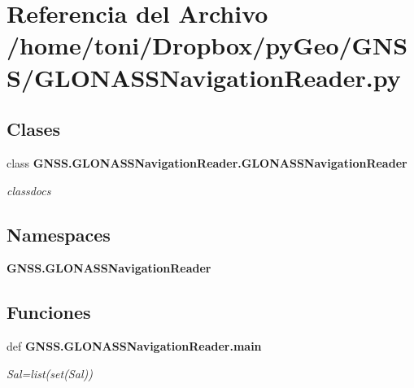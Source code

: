 \section{Referencia del Archivo /home/toni/\-Dropbox/py\-Geo/\-G\-N\-S\-S/\-G\-L\-O\-N\-A\-S\-S\-Navigation\-Reader.py}
\label{GLONASSNavigationReader_8py}
\subsection*{Clases}
\begin{DoxyCompactItemize}
\item 
class {\bf G\-N\-S\-S.\-G\-L\-O\-N\-A\-S\-S\-Navigation\-Reader.\-G\-L\-O\-N\-A\-S\-S\-Navigation\-Reader}
\begin{DoxyCompactList}\small\item\em classdocs \end{DoxyCompactList}\end{DoxyCompactItemize}
\subsection*{Namespaces}
\begin{DoxyCompactItemize}
\item 
{\bf G\-N\-S\-S.\-G\-L\-O\-N\-A\-S\-S\-Navigation\-Reader}
\end{DoxyCompactItemize}
\subsection*{Funciones}
\begin{DoxyCompactItemize}
\item 
def {\bf G\-N\-S\-S.\-G\-L\-O\-N\-A\-S\-S\-Navigation\-Reader.\-main}
\begin{DoxyCompactList}\small\item\em Sal=list(set(\-Sal)) \end{DoxyCompactList}\end{DoxyCompactItemize}
